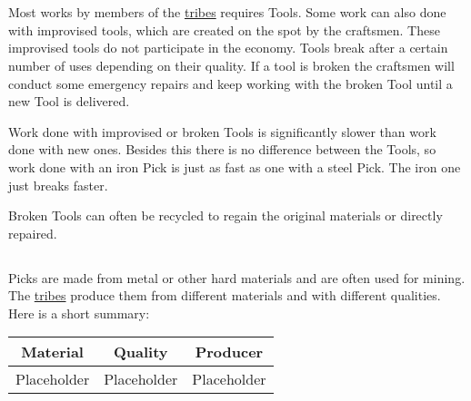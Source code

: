 \section{}\label{ch:Goods:Tools}

Most works by members of the \hyperref[ch:Tribes]{tribes} requires
\glspl{Tool}. Some work can also done with improvised tools, which are created
on the spot by the craftsmen. These improvised tools do not participate in the
economy. \Glspl{Tool} break after a certain number of uses depending on their
quality. If a tool is broken the craftsmen will conduct some emergency repairs
and keep working with the broken \gls{Tool} until a new \gls{Tool} is
delivered.

Work done with improvised or broken \glspl{Tool} is significantly slower than
work done with new ones. Besides this there is no difference between the
\glspl{Tool}, so work done with an iron \gls{Pick} is just as fast as one with
a steel \gls{Pick}. The iron one just breaks faster.

Broken \glspl{Tool} can often be recycled to regain the original materials or
directly repaired.

\subsection{}

\Glspl{Pick} are made from metal or other hard materials and are often used for mining.
The
\hyperref[ch:Tribes]{tribes}
produce them from different materials and with different qualities.
Here is a short summary:

\begin{longtable}{ccc}
	\toprule
	Material    & Quality     & Producer    \\
	\midrule
	Placeholder & Placeholder & Placeholder \\
	\bottomrule
\end{longtable}
